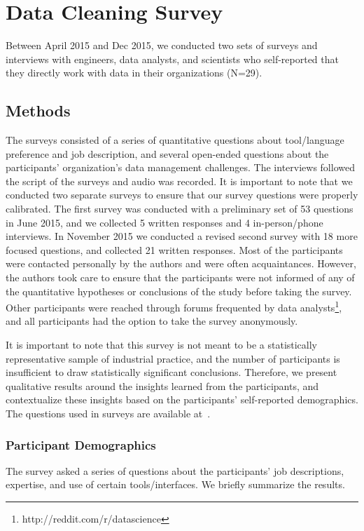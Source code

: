 \section{Data Cleaning Survey}
Between April 2015 and Dec 2015, we conducted two sets of surveys and interviews with engineers, data analysts, and scientists who self-reported that they directly work with data in their organizations (N=29).

\subsection{Methods}\label{sec:survey}
The surveys consisted of a series of quantitative questions about tool/language preference and job description, and several open-ended questions about the participants' organization's data management challenges. The interviews followed the script of the surveys and audio was recorded.
It is important to note that we conducted two separate surveys to ensure that our survey questions were properly calibrated.
The first survey was conducted with a preliminary set of 53 questions in June 2015, and we collected 5 written responses and 4 in-person/phone interviews.
In November 2015 we conducted a revised second survey with 18 more focused questions, and collected 21 written responses. 
Most of the participants were contacted personally by the authors and were often acquaintances.
However, the authors took care to ensure that the participants were not informed of any of the quantitative hypotheses or conclusions of the study before taking the survey. 
Other participants were reached through forums frequented by data analysts\footnote{http://reddit.com/r/datascience}, and all participants had the option to take the survey anonymously.

It is important to note that this survey is not meant to be a statistically representative sample of industrial practice, and the number of participants is insufficient to draw statistically significant conclusions. Therefore, we present qualitative results around the insights learned from the participants, and contextualize these insights based on the participants' self-reported demographics.
The questions used in surveys are available at~\cite{dcsurvey,dcsurvey2}.

\subsubsection{Participant Demographics}
The survey asked a series of questions about the participants' job descriptions, expertise, and use of certain tools/interfaces.
We briefly summarize the results.

